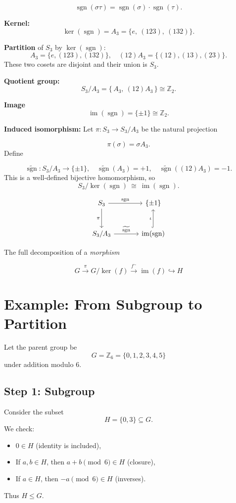 \documentclass[12pt]{article}
\begin{document}
$$
\operatorname{sgn}(\sigma \tau) = \operatorname{sgn}(\sigma) \cdot \operatorname{sgn}(\tau).
$$

\textbf{Kernel:}
$$
\ker(\operatorname{sgn}) = A_3 = \{ e,\ (123),\ (132) \}.
$$

\textbf{Partition }of $S_3$ by $\ker(\operatorname{sgn})$:
$$
A_3 = \{ e, (123), (132) \}, \quad (12)A_3 = \{ (12), (13), (23) \}.
$$
These two cosets are disjoint and their union is $S_3$.

\textbf{Quotient group:}
$$
S_3 / A_3 = \{\, A_3,\ (12)A_3 \,\} \cong \mathbb{Z}_2.
$$

\textbf{Image}
$$
\operatorname{im}(\operatorname{sgn}) = \{\pm 1\} \cong \mathbb{Z}_2.
$$

\textbf{Induced isomorphism:} Let $\pi : S_3 \to S_3/A_3$ be the natural projection

$$
\pi(\sigma) = \sigma A_3.
$$
Define

$$
\widetilde{\operatorname{sgn}} : S_3 / A_3 \longrightarrow \{\pm 1\}, \quad 
\widetilde{\operatorname{sgn}}(A_3) = +1, \quad \widetilde{\operatorname{sgn}}((12)A_3) = -1.
$$
This is a well-defined bijective homomorphism, so
$$
S_3 / \ker(\operatorname{sgn}) \ \cong \ \operatorname{im}(\operatorname{sgn}).
$$

$$
\begin{tikzcd}[row sep=large, column sep=large]
	S_3 \arrow[r, "\operatorname{sgn}"] \arrow[d, "\pi"'] 
	& \{\pm 1\} \\
	S_3 / A_3 \arrow[r, "\widetilde{\operatorname{sgn}}"] 
	& \operatorname{im}(\operatorname{sgn}) \arrow[u, hook, "\iota"]
\end{tikzcd}
$$


The full decomposition of a \textit{morphism} 

$$
G \xrightarrow{\pi} G/\ker(f) \xrightarrow{f^{\sim}} \operatorname{im}(f) \hookrightarrow H
$$

\section*{Example: From Subgroup to Partition}

Let the parent group be 
$$
G = \mathbb{Z}_6 = \{0,1,2,3,4,5\}
$$
under addition modulo $6$.

\subsection*{Step 1: Subgroup}
Consider the subset
$$
H = \{0,3\} \subseteq G .
$$
We check:
\begin{itemize}
	\item $0 \in H$ (identity is included),
	\item If $a,b \in H$, then $a+b \pmod{6} \in H$ (closure),
	\item If $a \in H$, then $-a \pmod{6} \in H$ (inverses).
\end{itemize}
Thus $H \leq G$.
\end{document}
